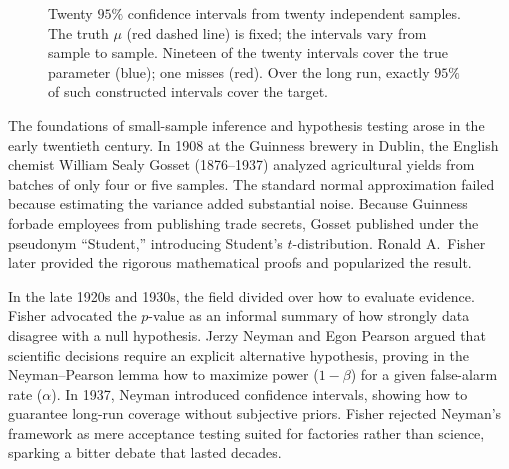 \begin{figure}[H]
\caption{Twenty $95\%$ confidence intervals from twenty independent samples. The truth
$\mu$ (red dashed line) is fixed; the intervals vary from sample to sample.
Nineteen of the twenty intervals cover the true parameter (blue); one misses (red). Over the long
run, exactly $95\%$ of such constructed intervals cover the target.}
\label{ch32:fig-coverage}
\end{figure}

\begin{historybox}
The foundations of small-sample inference and hypothesis testing arose in the
early twentieth century. In 1908 at the Guinness brewery in Dublin, the English
chemist William Sealy Gosset (1876--1937) analyzed agricultural yields from
batches of only four or five samples. The standard normal approximation failed
because estimating the variance added substantial noise. Because Guinness
forbade employees from publishing trade secrets, Gosset published under the
pseudonym ``Student,'' introducing Student's $t$-distribution. Ronald A.\ Fisher
later provided the rigorous mathematical proofs and popularized the result.

In the late 1920s and 1930s, the field divided over how to evaluate evidence.
Fisher advocated the $p$-value as an informal summary of how strongly data
disagree with a null hypothesis. Jerzy Neyman and Egon Pearson argued that
scientific decisions require an explicit alternative hypothesis, proving in the
Neyman--Pearson lemma how to maximize power ($1-\beta$) for a given false-alarm
rate ($\alpha$). In 1937, Neyman introduced confidence intervals, showing how to
guarantee long-run coverage without subjective priors. Fisher rejected Neyman's
framework as mere acceptance testing suited for factories rather than science,
sparking a bitter debate that lasted decades.
\end{historybox}

